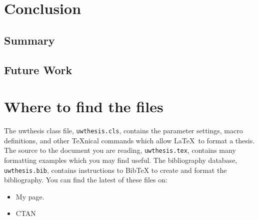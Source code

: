 \documentclass [11pt, proquest] {uwthesis}[2015/03/03]
\begin{document}

\chapter{Conclusion}

\section{Summary}

\section{Future Work}



%
%
\nocite{*}   %


%
%
\appendix
\raggedbottom\sloppy
 
 
\chapter{Where to find the files}
 
The uwthesis class file, {\tt uwthesis.cls}, contains the parameter settings,
macro definitions, and other \TeX nical commands which
allow \LaTeX\ to format a thesis.  
The source to
the document you are reading, {\tt uwthesis.tex},
contains many formatting examples
which you may find useful.
The bibliography database, {\tt uwthesis.bib}, contains instructions
to BibTeX to create and format the bibliography.
You can find the latest of these files on:

\begin{itemize}
\item My page.
\begin{description}
\item[] \verb%http://staff.washington.edu/fox/tex/uwthesis.html%
\end{description}

\item CTAN

\end{itemize}

\end{document}
